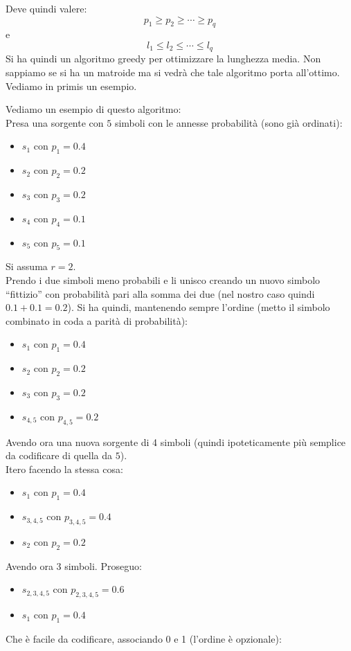 \documentclass[a4paper,12pt, oneside]{book}
\begin{document}
Deve quindi valere:
\[p_1\geq p_2\geq \cdots\geq p_q\]
e
\[l_1\leq l_2\leq \cdots \leq l_q\]
Si ha quindi un algoritmo greedy per ottimizzare la lunghezza media. Non
sappiamo se si ha un matroide ma si vedrà che tale algoritmo porta
all'ottimo. Vediamo in primis un esempio.
\begin{esempio}
  Vediamo un esempio di questo algoritmo:\\
  Presa una sorgente con $5$ simboli con le annesse probabilità (sono già
  ordinati): 
  \begin{itemize}
    \item $s_1$ con $p_1=0.4$
    \item $s_2$ con $p_2=0.2$
    \item $s_3$ con $p_3=0.2$
    \item $s_4$ con $p_4=0.1$
    \item $s_5$ con $p_5=0.1$
  \end{itemize}
  Si assuma $r=2$.\\
  Prendo i due simboli meno probabili e li unisco creando un nuovo simbolo
  ``fittizio'' con probabilità pari alla somma dei due (nel nostro caso quindi
  $0.1+0.1=0.2$). Si ha quindi, mantenendo sempre l'ordine (metto il simbolo
  combinato in coda a parità di probabilità):
  \begin{itemize}
    \item $s_1$ con $p_1=0.4$
    \item $s_2$ con $p_2=0.2$
    \item $s_3$ con $p_3=0.2$
    \item $s_{4,5}$ con $p_{4,5}=0.2$
  \end{itemize}
  Avendo ora una nuova sorgente di 4 simboli (quindi ipoteticamente più semplice
  da codificare di quella da $5$).\\
  Itero facendo la stessa cosa:
  \begin{itemize}
    \item $s_1$ con $p_1=0.4$
    \item $s_{3,4,5}$ con $p_{3,4,5}=0.4$
    \item $s_2$ con $p_2=0.2$
  \end{itemize}
  Avendo ora 3 simboli. Proseguo:
  \begin{itemize}
    \item $s_{2,3,4,5}$ con $p_{2,3,4,5}=0.6$
    \item $s_1$ con $p_1=0.4$
  \end{itemize}
  Che è facile da codificare, associando 0 e 1 (l'ordine è opzionale):

\end{esempio}
\end{document}
